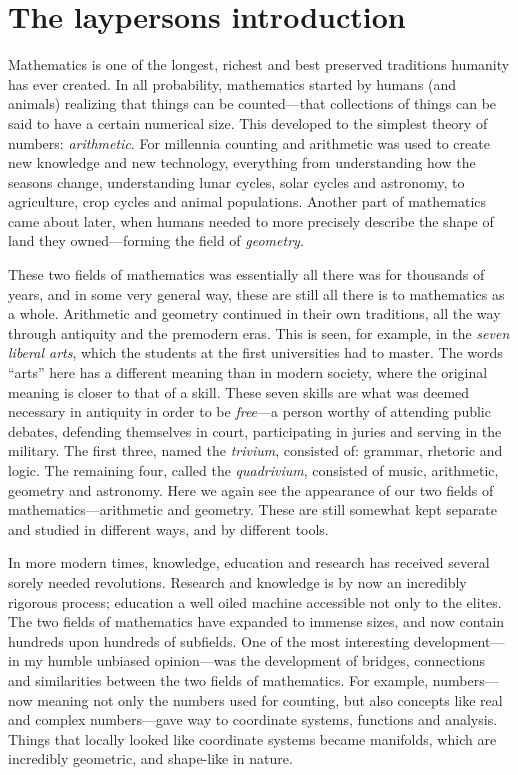 
\section{The laypersons introduction}

Mathematics is one of the longest, richest and best preserved traditions humanity has ever created. In all probability, mathematics started by humans (and animals) realizing that things can be counted---that collections of things can be said to have a certain numerical size. This developed to the simplest theory of numbers: \emph{arithmetic}. For millennia counting and arithmetic was used to create new knowledge and new technology, everything from understanding how the seasons change, understanding lunar cycles, solar cycles and astronomy, to agriculture, crop cycles and animal populations. Another part of mathematics came about later, when humans needed to more precisely describe the shape of land they owned---forming the field of \emph{geometry}. 

These two fields of mathematics was essentially all there was for thousands of years, and in some very general way, these are still all there is to mathematics as a whole. Arithmetic and geometry continued in their own traditions, all the way through antiquity and the premodern eras. This is seen, for example, in the \emph{seven liberal arts}, which the students at the first universities had to master. The words ``arts'' here has a different meaning than in modern society, where the original meaning is closer to that of a skill. These seven skills are what was deemed necessary in antiquity in order to be \emph{free}---a person worthy of attending public debates, defending themselves in court, participating in juries and serving in the military. The first three, named the \emph{trivium}, consisted of: grammar, rhetoric and logic. The remaining four, called the \emph{quadrivium}, consisted of music, arithmetic, geometry and astronomy. Here we again see the appearance of our two fields of mathematics---arithmetic and geometry. These are still somewhat kept separate and studied in different ways, and by different tools. 

In more modern times, knowledge, education and research has received several sorely needed revolutions. Research and knowledge is by now an incredibly rigorous process; education a well oiled machine accessible not only to the elites. The two fields of mathematics have expanded to immense sizes, and now contain hundreds upon hundreds of subfields. One of the most interesting development---in my humble unbiased opinion---was the development of bridges, connections and similarities between the two fields of mathematics. For example, numbers---now meaning not only the numbers used for counting, but also concepts like real and complex numbers---gave way to coordinate systems, functions and analysis. Things that locally looked like coordinate systems became manifolds, which are incredibly geometric, and shape-like in nature. 

